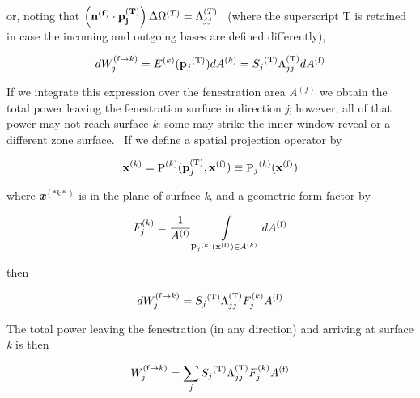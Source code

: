 or, noting that \(\left(\bf{n}^{(f)}\cdot\bf{p}_j^{(T)}\right) \Delta\Omega^{(T)} = \Lambda_{jj}^{(T)}\) ~(where the superscript T is retained in case the incoming and outgoing bases are defined differently),

\begin{equation}
dW_j^{{\rm{(f}} \to k{\rm{)}}} = {E^{{\rm{(}}k{\rm{)}}}}({{\bf{p}}_j}^{{\rm{(T)}}})d{A^{{\rm{(}}k{\rm{)}}}} = {S_j}^{{\rm{(T)}}}\Lambda_{jj}^{{\rm{(T)}}}d{A^{{\rm{(f)}}}}
\end{equation}

If we integrate this expression over the fenestration area \emph{A}\(^{(f)}\) we obtain the total power leaving the fenestration surface in direction \emph{j}; however, all of that power may not reach surface \emph{k}: some may strike the inner window reveal or a different zone surface.~ If we define a spatial projection operator by

\begin{equation}
{{\bf{x}}^{{\rm{(}}k{\rm{)}}}} = {{\mathop{\rm P}\nolimits} ^{{\rm{(}}k{\rm{)}}}}({\bf{p}}_j^{{\rm{(T)}}},{{\bf{x}}^{{\rm{(f)}}}}) \equiv {{\mathop{\rm P}\nolimits}_j}^{{\rm{(}}k{\rm{)}}}({{\bf{x}}^{{\rm{(f)}}}})
\end{equation}

where \textbf{\emph{x}}\(^{(*k*)}\) is in the plane of surface \emph{k}, and a geometric form factor by

\begin{equation}
F_j^{{\rm{(}}k{\rm{)}}} = \frac{1}{{{A^{{\rm{(f)}}}}}}\int\limits_{{{\mathop{\rm P}\nolimits}_j}^{{\rm{(}}k{\rm{)}}}({{\bf{x}}^{{\rm{(f)}}}}) \in {A^{{\rm{(}}k{\rm{)}}}}} {d{A^{{\rm{(f)}}}}}
\end{equation}

then

\begin{equation}
dW_j^{{\rm{(f}} \to k{\rm{)}}} = {S_j}^{{\rm{(T)}}}\Lambda_{jj}^{{\rm{(T)}}}F_j^{{\rm{(}}k{\rm{)}}}{A^{{\rm{(f)}}}}
\end{equation}

The total power leaving the fenestration (in any direction) and arriving at surface \emph{k} is then

\begin{equation}
W_j^{{\rm{(f}} \to k{\rm{)}}} = \sum\limits_j {{S_j}^{{\rm{(T)}}}\Lambda_{jj}^{{\rm{(T)}}}F_j^{{\rm{(}}k{\rm{)}}}{A^{{\rm{(f)}}}}}
\end{equation}

